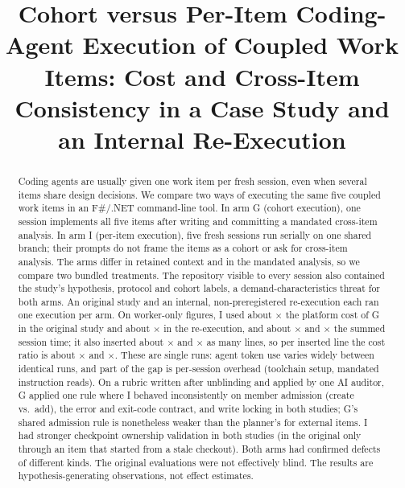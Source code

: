 \documentclass[10pt,conference]{IEEEtran}
\newcommand{\G}{G}
\newcommand{\I}{I}
\begin{document}
\title{Cohort versus Per-Item Coding-Agent Execution of Coupled Work Items: Cost and Cross-Item Consistency in a Case Study and an Internal Re-Execution}

\author{}

\maketitle

\begin{abstract}
Coding agents are usually given one work item per fresh session, even when several items share design decisions. We compare two ways of executing the same five coupled work items in an F\#/.NET command-line tool. In arm \G{} (cohort execution), one session implements all five items after writing and committing a mandated cross-item analysis. In arm \I{} (per-item execution), five fresh sessions run serially on one shared branch; their prompts do not frame the items as a cohort or ask for cross-item analysis. %
The arms differ in retained context and in the mandated analysis, so we compare two bundled treatments. The repository visible to every session also contained the study's hypothesis, protocol and cohort labels, a demand-characteristics threat for both arms. %
An original study and an internal, non-preregistered re-execution each ran one execution per arm. %
On worker-only figures, \I{} used about \AcostRatio$\times$ the platform cost of \G{} in the original study and about \RtwoCostRatio$\times$ in the re-execution, and about \AactiveRatio$\times$ and \RtwoActiveRatio$\times$ the summed session time; it also inserted about \AinsLinesRatio$\times$ and \RtwoInsLinesRatio$\times$ as many lines, so per inserted line the cost ratio is about \AcostPerLineRatio$\times$ and \RtwoCostPerLineRatio$\times$. These are single runs: agent token use varies widely between identical runs, and part of the gap is per-session overhead (toolchain setup, mandated instruction reads). %
On a rubric written after unblinding and applied by one AI auditor, \G{} applied one rule where \I{} behaved inconsistently on member admission (create vs.\ add), the error and exit-code contract, and write locking in both studies; \G's shared admission rule is nonetheless weaker than the planner's for external items. %
\I{} had stronger checkpoint ownership validation in both studies (in the original only through an item that started from a stale checkout). Both arms had confirmed defects of different kinds. %
The original evaluations were not effectively blind. The results are hypothesis-generating observations, not effect estimates.
\end{abstract}
\end{document}
